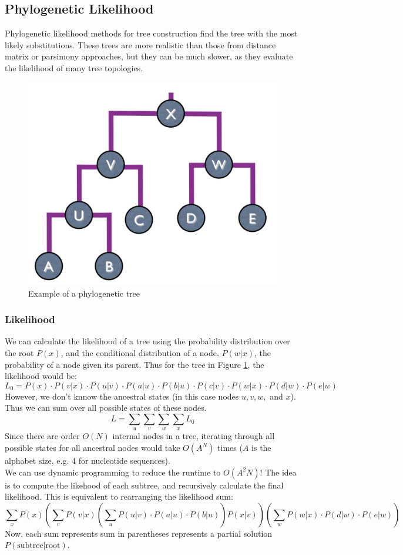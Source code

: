 \documentclass[12pt]{article}
\begin{document}
\subsection{Phylogenetic Likelihood}
Phylogenetic likelihood methods for tree construction find the tree with the most likely substitutions. These trees are more realistic than those from distance matrix or parsimony approaches, but they can be much slower, as they evaluate the likelihood of many tree topologies.
\begin{figure}[h]
    \centering
    \includegraphics[width=.5\linewidth]{tree.png}
    \caption{Example of a phylogenetic tree}
    \label{fig:tree}
\end{figure}
\subsubsection{Likelihood}
We can calculate the likelihood of a tree using the probability distribution over the root $P(x)$, and the conditional distribution of a node, $P(w|x)$, the probability of a node given its parent. Thus for the tree in Figure \ref{fig:tree}, the likelihood would be:
$$L_0 = P(x) \cdot P(v|x) \cdot P(u|v) \cdot P(a|u) \cdot P(b|u) \cdot P(c|v) \cdot P(w|x) \cdot P(d|w) \cdot P(e|w)$$
However, we don't knnow the ancestral states (in this case nodes $u, v, w, $ and $x$). Thus we can sum over all possible states of these nodes.
$$L = \sum_u\sum_v\sum_w\sum_xL_0$$
Since there are order $O(N)$ internal nodes in a tree, iterating through all possible states for all ancestral nodes would take $O(A^N)$ times ($A$ is the alphabet size, e.g. 4 for nucleotide sequences).\\[10pt]
We can use dynamic programming to reduce the runtime to $O(A^2N)$! The idea is to compute the likehood of each subtree, and recursively calculate the final likelihood. This is equivalent to rearranging the likelihood sum:
$$\sum_x P(x) \left(\sum_v P(v|x)\left(\sum_u P(u|v) \cdot P(a|u) \cdot P(b|u)\right) P(x|v) \right)\left(\sum_w P(w|x)\cdot P(d|w) \cdot P(e|w)\right)$$
Now, each sum represents sum in parentheses represents a partial solution $P(\text{subtree} | \text{root})$.
\end{document}
